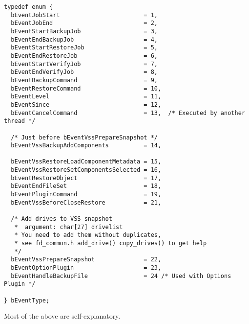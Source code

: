 \begin{verbatim}
typedef enum {
  bEventJobStart                        = 1,
  bEventJobEnd                          = 2,
  bEventStartBackupJob                  = 3,
  bEventEndBackupJob                    = 4,
  bEventStartRestoreJob                 = 5,
  bEventEndRestoreJob                   = 6,
  bEventStartVerifyJob                  = 7,
  bEventEndVerifyJob                    = 8,
  bEventBackupCommand                   = 9,
  bEventRestoreCommand                  = 10,
  bEventLevel                           = 11,
  bEventSince                           = 12,
  bEventCancelCommand                   = 13,  /* Executed by another thread */
 
  /* Just before bEventVssPrepareSnapshot */
  bEventVssBackupAddComponents          = 14,  

  bEventVssRestoreLoadComponentMetadata = 15,
  bEventVssRestoreSetComponentsSelected = 16,
  bEventRestoreObject                   = 17,
  bEventEndFileSet                      = 18,
  bEventPluginCommand                   = 19,
  bEventVssBeforeCloseRestore           = 21,

  /* Add drives to VSS snapshot 
   *  argument: char[27] drivelist
   * You need to add them without duplicates, 
   * see fd_common.h add_drive() copy_drives() to get help
   */
  bEventVssPrepareSnapshot              = 22,
  bEventOptionPlugin                    = 23,
  bEventHandleBackupFile                = 24 /* Used with Options Plugin */

} bEventType;

\end{verbatim}
 
Most of the above are self-explanatory.

